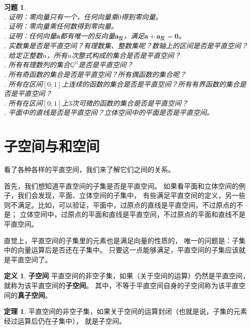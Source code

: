 \documentclass[12pt,UTF8]{ctexbook}
\theoremstyle{definition}
\newtheorem{df}{定义}[section]
\newtheorem{tm}{定理}[section]
\theoremstyle{plain}
\newtheorem{xt}{习题}[section]
\begin{document}
\begin{xt}
    \mbox{} \\
    . 证明：零向量只有一个，任何向量乘$0$得到零向量。\\
    . 证明：零向量乘任何数得到零向量。\\
    . 证明：任何向量$\mathbf{a}$都有唯一的反向量$\mathbf{a}_{\text{反}}$，满足$\mathbf{a} + \mathbf{a}_{\text{反}} = \mathbf{0}$。\\
    . 实数集是否是平直空间？有理数集、整数集呢？数轴上的区间是否是平直空间？\\
    . 给定正整数$n$，所有$n$次整式构成的集合是否是平直空间？\\
    . 所有有理数列的集合$\mathbb{Q}^\mathbb{N}$是否是平直空间？\\
    . 所有奇函数的集合是否是平直空间？所有偶函数的集合呢？\\
    . 所有在区间$[0;1]$上连续的函数的集合是否是平直空间？所有有界函数的集合是否是平直空间？\\
    . 所有在区间$[0;1]$上$3$次可微的函数的集合是否是平直空间？\\
    . 平面中的直线是否是平直空间？立体空间中的平面是否是平直空间。
\end{xt}

\section{子空间与和空间}
看了各种各样的平直空间，我们来了解它们之间的关系。

首先，我们想知道平直空间的子集是否是平直空间。
如果看平面和立体空间的例子，我们会发现，平面、立体空间的子集中，
有些满足平直空间的定义，另一些则不满足。比如，可以验证，平面中，过原点的直线是平直空间，不过原点的不是；
立体空间中，过原点的平面和直线是平直空间，不过原点的平面和直线不是平直空间。

直觉上，平直空间的子集里的元素也是满足向量的性质的，
唯一的问题是：子集中的向量运算后是否还在子集中。
只要这一点能够满足，平直空间的子集应该就是平直空间了。

\begin{df}{\textbf{子空间}}
    平直空间的非空子集，如果（关于空间的运算）仍然是平直空间，就称为该平直空间的\textbf{子空间}。
    其中，不等于平直空间自身的子空间称为该平直空间的\textbf{真子空间}。
\end{df}

\begin{tm}
    平直空间的非空子集，如果关于空间的运算封闭（也就是说，子集的元素经过运算后仍在子集中），
    就是子空间。
\end{tm}
\end{document}
